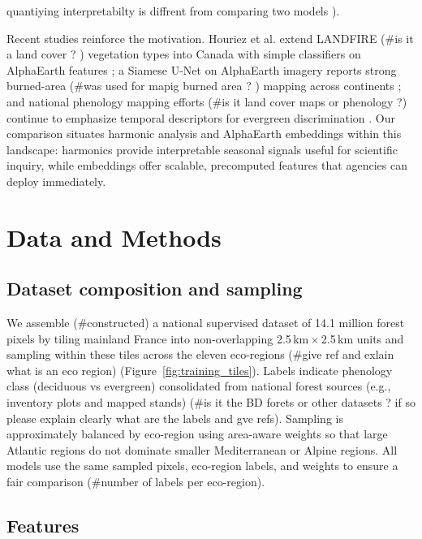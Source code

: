 \documentclass[utf8]{FrontiersinHarvard}
\begin{document}
quantiying interpretabilty is diffrent from comparing two models ).

Recent studies reinforce the motivation. Houriez et al. extend LANDFIRE (#is it a land cover ? ) vegetation types into Canada with simple classifiers on AlphaEarth features \citep{Houriez2025AEFDataGen}; a Siamese U-Net on AlphaEarth imagery reports strong burned-area (#was used for mapig burned area ? ) mapping across continents \citep{Seydi2025AlphaEarthBurnedArea}; and national phenology mapping efforts (#is it land cover maps or phenology ?) continue to emphasize temporal descriptors for evergreen discrimination \citep{Inglada2017,Li2023,Low2020,Bolton2020}. Our comparison situates harmonic analysis and AlphaEarth embeddings within this landscape: harmonics provide interpretable seasonal signals useful for scientific inquiry, while embeddings offer scalable, precomputed features that agencies can deploy immediately.

\section{Data and Methods}

\subsection{Dataset composition and sampling}
We assemble (#constructed) a national supervised dataset of 14.1 million forest pixels by tiling mainland France into non-overlapping 2.5\,km\,$\times$\,2.5\,km units and sampling within these tiles across the eleven eco-regions (#give ref and exlain what is an eco region) (Figure~\ref{fig:training_tiles}). Labels indicate phenology class (deciduous vs evergreen) consolidated from national forest sources (e.g., inventory plots and mapped stands) (#is it the BD forets or other datasets ? if so please explain clearly what are the labels and gve refs). Sampling is approximately balanced by eco-region using area-aware weights so that large Atlantic regions do not dominate smaller Mediterranean or Alpine regions. All models use the same sampled pixels, eco-region labels, and weights to ensure a fair comparison (#number of labels per eco-region).

\subsection{Features}
\end{document}

